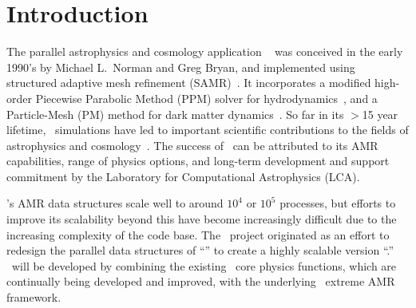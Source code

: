 \documentclass[11pt,letterpaper]{article}
\begin{document}
\section{Introduction} \label{s:intro}





 The parallel astrophysics and
cosmology application \enzo~\cite{OsBr04} was conceived in the early
1990's by Michael L.~Norman and Greg Bryan, and implemented using
structured adaptive mesh refinement (SAMR)~\cite{BeCo89}.  It
incorporates a modified high-order Piecewise Parabolic Method (PPM)
solver for hydrodynamics~\cite{WoCo84b}, and a Particle-Mesh (PM)
method for dark matter dynamics~\cite{HoEa88}.  So far in its $>$15
year lifetime, \enzo\ simulations have led to important scientific
contributions to the fields of astrophysics and 
cosmology~\cite{AbBr02,Hallman07,Kritsuk09,Padoan05}.
The success of \enzo\ can be attributed to
its AMR capabilities, range of physics options, and long-term
development and support commitment by the Laboratory for Computational
Astrophysics (LCA).

\enzo's AMR data structures scale well to around $10^4$ or $10^5$
processes, but efforts to improve its scalability beyond this have
become increasingly difficult due to the increasing
complexity of the code base.  The \cello\ project
originated as an effort to redesign the parallel data structures of
``\enzo'' to create a highly scalable version ``\enzoii.''  \enzoii\
will be developed by combining the existing \enzo\ core physics
functions, which are continually being developed and improved, with
the underlying \cello\ extreme AMR framework.
\end{document}

